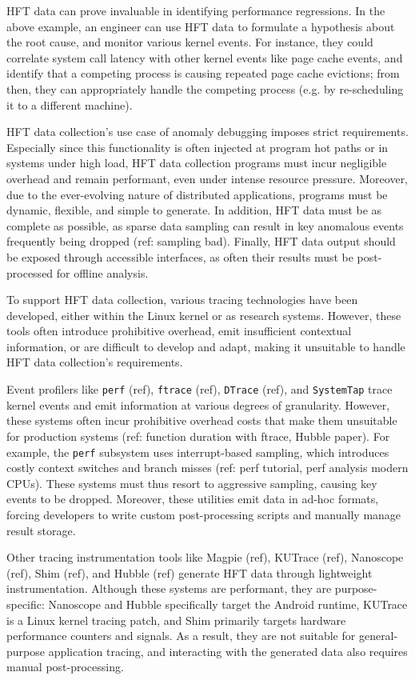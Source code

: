 HFT data can prove invaluable in identifying performance regressions. In the above example, an
engineer can use HFT data to formulate a hypothesis about the root cause, and monitor various kernel
events. For instance, they could correlate system call latency with other kernel events like page
cache events, and identify that a competing process is causing repeated page cache evictions; from
then, they can appropriately handle the competing process (e.g. by re-scheduling it to a different
machine).

HFT data collection's use case of anomaly debugging imposes strict requirements. Especially since
this functionality is often injected at program hot paths or in systems under high load, HFT data
collection programs must incur negligible overhead and remain performant, even under intense
resource pressure. Moreover, due to the ever-evolving nature of distributed applications, programs
must be dynamic, flexible, and simple to generate. In addition, HFT data must be as complete as
possible, as sparse data sampling can result in key anomalous events frequently being dropped (ref:
sampling bad). Finally, HFT data output should be exposed through accessible interfaces, as often
their results must be post-processed for offline analysis.

To support HFT data collection, various tracing technologies have been developed, either within the
Linux kernel or as research systems. However, these tools often introduce prohibitive overhead, emit
insufficient contextual information, or are difficult to develop and adapt, making it unsuitable to
handle HFT data collection's requirements.

Event profilers like \texttt{perf} (ref), \texttt{ftrace} (ref), \texttt{DTrace} (ref), and
\texttt{SystemTap} trace kernel events and emit information at various degrees of granularity.
However, these systems often incur prohibitive overhead costs that make them unsuitable for
production systems (ref: function duration with ftrace, Hubble paper). For example, the
\texttt{perf} subsystem uses interrupt-based sampling, which introduces costly context switches and
branch misses (ref: perf tutorial, perf analysis modern CPUs). These systems must thus resort to
aggressive sampling, causing key events to be dropped. Moreover, these utilities emit data in ad-hoc
formats, forcing developers to write custom post-processing scripts and manually manage result
storage.

Other tracing instrumentation tools like Magpie (ref), KUTrace (ref), Nanoscope (ref), Shim (ref),
and Hubble (ref) generate HFT data through lightweight instrumentation. Although these systems are
performant, they are purpose-specific: Nanoscope and Hubble specifically target the Android runtime,
KUTrace is a Linux kernel tracing patch, and Shim primarily targets hardware performance counters
and signals. As a result, they are not suitable for general-purpose application tracing, and
interacting with the generated data also requires manual post-processing.

